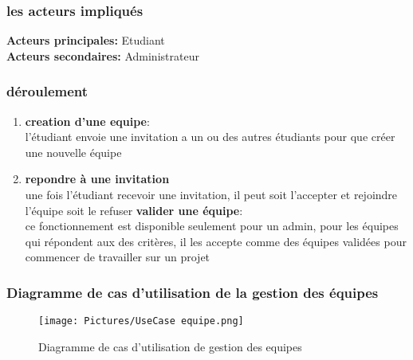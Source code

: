 \documentclass[11pt,fleqn]{book} %
\begin{document}
\subsubsection{les acteurs impliqués}
\textbf{Acteurs principales: }Etudiant \\
\textbf{Acteurs secondaires: }Administrateur
\subsubsection{déroulement}
\begin{enumerate}
    \item \textbf{creation  d'une equipe}:\\
    l'étudiant envoie une invitation a un ou des autres étudiants pour que créer une nouvelle équipe
    \item \textbf{repondre à une invitation}\\
    une fois l'étudiant recevoir une invitation, il peut soit l'accepter et rejoindre l'équipe soit le refuser
    \textbf{valider une équipe}:\\
    ce fonctionnement est disponible seulement pour un admin, pour les équipes qui répondent aux des critères, il les accepte comme des équipes validées pour commencer de travailler sur un projet
\end{enumerate}




\subsubsection{Diagramme de cas d’utilisation de la gestion des équipes}
\begin{figure}[h]
    \centering
    \texttt{[image: Pictures/UseCase equipe.png]}
    \caption{Diagramme de cas d'utilisation de gestion des equipes}
    \label{fig:pca}
\end{figure}
\end{document}
